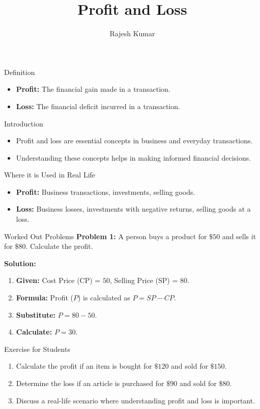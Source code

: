 \title{Profit and Loss}
\author{Rajesh Kumar}
\date{}

\begin{frame}{Definition}
  \begin{itemize}
    \item \textbf{Profit:} The financial gain made in a transaction.
    \item \textbf{Loss:} The financial deficit incurred in a transaction.
  \end{itemize}
\end{frame}

\begin{frame}{Introduction}
  \begin{itemize}
    \item Profit and loss are essential concepts in business and everyday transactions.
    \item Understanding these concepts helps in making informed financial decisions.
  \end{itemize}
\end{frame}

\begin{frame}{Where it is Used in Real Life}
  \begin{itemize}
    \item \textbf{Profit:} Business transactions, investments, selling goods.
    \item \textbf{Loss:} Business losses, investments with negative returns, selling goods at a loss.
  \end{itemize}
\end{frame}

\begin{frame}{Worked Out Problems}
  \textbf{Problem 1:} A person buys a product for $\$50$ and sells it for $\$80$. Calculate the profit.

  \textbf{Solution:}
  \begin{enumerate}
    \item \textbf{Given:} Cost Price (CP) = $50$, Selling Price (SP) = $80$.
    \item \textbf{Formula:} Profit ($P$) is calculated as $P = SP - CP$.
    \item \textbf{Substitute:} $P = 80 - 50$.
    \item \textbf{Calculate:} $P = 30$.
  \end{enumerate}
\end{frame}

\begin{frame}{Exercise for Students}
  \begin{enumerate}
    \item Calculate the profit if an item is bought for $\$120$ and sold for $\$150$.
    \item Determine the loss if an article is purchased for $\$90$ and sold for $\$80$.
    \item Discuss a real-life scenario where understanding profit and loss is important.
  \end{enumerate}
\end{frame}

